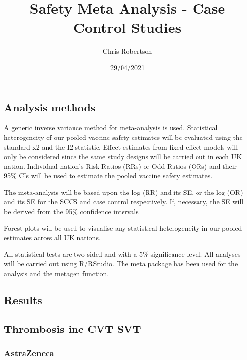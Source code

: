 \documentclass[]{article}
\title{Safety Meta Analysis - Case Control Studies}
\author{Chris Robertson}
\date{29/04/2021}
\begin{document}
\maketitle

\subsection{Analysis methods}\label{analysis-methods}

A generic inverse variance method for meta-analysis is used. Statistical
heterogeneity of our pooled vaccine safety estimates will be evaluated
using the standard x2 and the I2 statistic. Effect estimates from
fixed-effect models will only be considered since the same study designs
will be carried out in each UK nation. Individual nation's Risk Ratios
(RRs) or Odd Ratios (ORs) and their 95\% CIs will be used to estimate
the pooled vaccine safety estimates.

The meta-analysis will be based upon the log (RR) and its SE, or the log
(OR) and its SE for the SCCS and case control respectively. If,
necessary, the SE will be derived from the 95\% confidence intervals

Forest plots will be used to visualise any statistical heterogeneity in
our pooled estimates across all UK nations.

All statistical tests are two sided and with a 5\% significance level.
All analyses will be carried out using R/RStudio. The meta package has
been used for the analysis and the metagen function.

\subsection{Results}\label{results}

\subsection{Thrombosis inc CVT SVT}\label{thrombosis-inc-cvt-svt}

\subsubsection{AstraZeneca}\label{astrazeneca}
\end{document}
